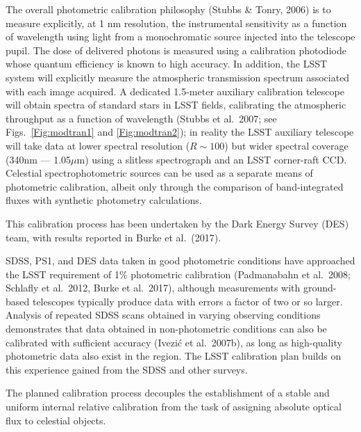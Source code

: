 
The overall photometric calibration philosophy (Stubbs \& Tonry, 2006) is to measure explicitly, at 1 nm resolution, the
instrumental sensitivity as a function of wavelength using light from a monochromatic source injected
into the telescope pupil. The dose of delivered photons is measured using a calibration photodiode whose quantum
efficiency is known to high accuracy. In addition, the LSST system will explicitly measure the atmospheric transmission
spectrum associated with each image acquired. A
dedicated 1.5-meter auxiliary calibration telescope will obtain spectra of
standard stars in LSST fields, calibrating the atmospheric throughput
as a function of wavelength  (Stubbs et al.~2007;
see Figs.~\ref{Fig:modtran1} and \ref{Fig:modtran2});  in reality the LSST auxiliary telescope will take
data at lower spectral resolution ($R \sim 100$) but wider spectral coverage (340nm --- 1.05$\mu$m) using a slitless spectrograph and an LSST corner-raft CCD.
Celestial spectrophotometric sources can be used as a separate means of photometric calibration, albeit only through the
comparison of band-integrated fluxes with synthetic photometry calculations.

This calibration process has been undertaken by the Dark Energy Survey (DES) team, with results reported in Burke et al.~(2017).

SDSS, PS1, and DES data
taken in good photometric conditions have approached the LSST
requirement of 1\% photometric calibration
(Padmanabahn et al.~2008; Schlafly et al.~2012, Burke et al.~2017), although measurements with ground-based telescopes
typically produce data with errors a factor of two or so larger. Analysis of
repeated SDSS scans obtained in varying observing conditions demonstrates that data
obtained in
non-photometric conditions can also be calibrated with
sufficient accuracy (Ivezi\'{c} et al.~2007b), as long as high-quality
photometric data also exist in the region.
The LSST calibration plan builds on this experience gained from the SDSS and other surveys.

The planned calibration process decouples the establishment of a stable and uniform internal
relative calibration from the task of assigning absolute optical flux to
celestial objects.

